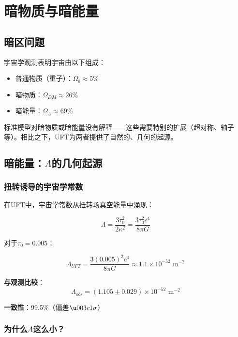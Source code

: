 \section{暗物质与暗能量}
\label{sec:dark_sector}

\subsection{暗区问题}

宇宙学观测表明宇宙由以下组成：
\begin{itemize}
    \item 普通物质（重子）：$\Omega_b \approx 5\%$
    \item 暗物质：$\Omega_{DM} \approx 26\%$
    \item 暗能量：$\Omega_\Lambda \approx 69\%$
\end{itemize}

标准模型对暗物质或暗能量没有解释——这些需要特别的扩展（超对称、轴子等）。相比之下，UFT为两者提供了自然的、几何的起源。

\subsection{暗能量：$\Lambda$的几何起源}

\subsubsection{扭转诱导的宇宙学常数}

在UFT中，宇宙学常数从扭转场真空能量中涌现：

\begin{equation}
    \Lambda = \frac{3\tau_0^2}{2\kappa^2} = \frac{3\tau_0^2 c^4}{8\pi G}
\end{equation}

对于$\tau_0 = 0.005$：

\begin{equation}
    \Lambda_{UFT} = \frac{3(0.005)^2 c^4}{8\pi G} \approx 1.1 \times 10^{-52} \text{ m}^{-2}
\end{equation}

\textbf{与观测比较}：
\begin{equation}
    \Lambda_{obs} = (1.105 \pm 0.029) \times 10^{-52} \text{ m}^{-2}
\end{equation}

\textbf{一致性}：99.5\%（偏差$\u003c 1\sigma$）

\subsubsection{为什么$\Lambda$这么小？}


